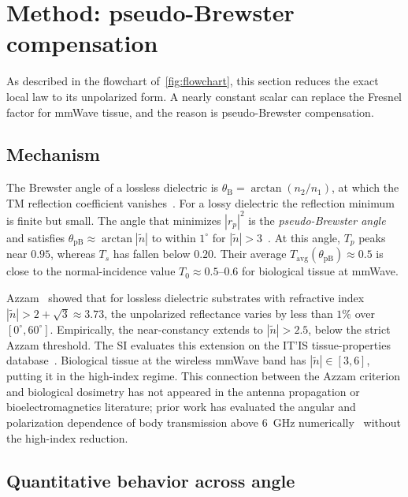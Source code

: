 \documentclass[journal,twocolumn,10pt]{IEEEtran}
\theoremstyle{plain}
\newcommand{\Tavg}{T_{\mathrm{avg}}}
\newcommand{\ntilde}{\tilde{n}}
\begin{document}
\section{Method: pseudo-Brewster compensation}\label{sec:pB}

As described in the flowchart of~\cref{fig:flowchart}, this section reduces
the exact local law to its unpolarized form. A nearly constant scalar
can replace the Fresnel factor for mmWave tissue, and the reason is
pseudo-Brewster compensation.

\subsection{Mechanism}\label{subsec:pB-mech}

The Brewster angle of a lossless dielectric is $\theta_{\mathrm{B}} =
\arctan(n_2/n_1)$, at which the TM reflection coefficient
vanishes~\cite{BornWolf1999}. For a lossy dielectric the reflection
minimum is finite but small. The angle that minimizes $|r_p|^2$ is
the \textit{pseudo-Brewster angle} and satisfies
$\theta_{\mathrm{pB}} \approx \arctan|\ntilde|$ to within $1^\circ$ for
$|\ntilde| > 3$~\cite{Potter1970,Ohman1977}. At this angle, $T_p$
peaks near $0.95$, whereas $T_s$ has fallen below $0.20$. Their
average $\Tavg(\theta_{\mathrm{pB}}) \approx 0.5$ is close to the
normal-incidence value $T_0 \approx 0.5$--$0.6$ for biological
tissue at mmWave.

Azzam~\cite{Azzam2015} showed that for lossless dielectric substrates
with refractive index $|\ntilde| > 2 + \sqrt{3} \approx 3.73$, the
unpolarized reflectance varies by less than $1\%$ over $[0^\circ,
60^\circ]$. Empirically, the near-constancy extends to $|\ntilde| > 2.5$,
below the strict Azzam threshold. The SI evaluates this extension on
the IT'IS tissue-properties database~\cite{ITISv5,Gabriel1996}. Biological tissue at the wireless mmWave
band has $|\ntilde| \in [3, 6]$, putting it in the high-index
regime. This connection between the Azzam criterion and biological dosimetry
has not appeared in the antenna propagation or bioelectromagnetics literature;
prior work has evaluated the angular and polarization
dependence of body transmission above $6$~GHz
numerically~\cite{Samaras2019} without the high-index reduction.

\subsection{Quantitative behavior across angle}\label{subsec:pB-quant}
\end{document}
